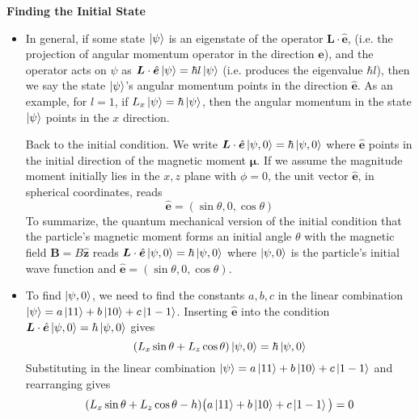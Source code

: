 \documentclass[11pt, a4paper]{article}
\renewcommand{\vec}[1]{\bm{#1}} %
\newcommand{\uvec}[1]{\hat{\vec{#1}}} %
\newcommand{\m}{\vec{\mu}}  %
\begin{document}
\textbf{Finding the Initial State}
\begin{itemize}	
	\item In general, if some state $ \ket{\psi} $ is an eigenstate of the operator $ \vec{L}\cdot \uvec{e} $, (i.e. the projection of angular momentum operator in the direction $ \uvec{e} $), and the operator acts on $ \psi $ as $  \vec{L}\cdot \uvec{e} \ket{\psi} = \hbar l \ket{\psi} $ (i.e. produces the eigenvalue $ \hbar l $), then we say the state $ \ket{\psi} $'s angular momentum points in the direction $ \uvec{e} $. As an example, for $ l = 1 $, if $ L_{x} \ket{\psi} = \hbar \ket{\psi} $, then the angular momentum in the state $ \ket{\psi} $ points in the $ x $ direction.
	
	Back to the initial condition. We write $ \vec{L}\cdot\uvec{e} \ket{\psi, 0} = \hbar \ket{\psi, 0} $ where $ \uvec{e} $ points in the initial direction of the magnetic moment $ \m $. If we assume the magnitude moment initially lies in the $ x, z $ plane with $ \phi = 0 $, the unit vector $ \uvec{e} $, in spherical coordinates, reads
	\begin{equation*}
		\uvec{e} = (\sin \theta, 0, \cos \theta)
	\end{equation*}
	To summarize, the quantum mechanical version of the initial condition that the particle's magnetic moment forms an initial angle $ \theta $ with the magnetic field $ \vec{B} = B \uvec{z} $ reads $ \vec{L}\cdot\uvec{e} \ket{\psi, 0} = \hbar \ket{\psi, 0} $ where $ \ket{\psi, 0} $ is the particle's initial wave function and $ \uvec{e} = (\sin \theta, 0, \cos \theta) $. 
	
	\item To find $ \ket{\psi, 0} $, we need to find the constants $ a, b, c $ in the linear combination $ \ket{\psi} = a \ket{11} + b \ket{10} + c \ket{1 -1} $. Inserting $ \uvec{e} $ into the condition $ \vec{L}\cdot\uvec{e} \ket{\psi, 0} = \hbar \ket{\psi, 0} $ gives
	\begin{equation*}
		(L_{x}\sin \theta + L_{z}\cos \theta)\ket{\psi, 0} = \hbar \ket{\psi, 0}
	\end{equation*}
	Substituting in the linear combination $ \ket{\psi} = a \ket{11} + b \ket{10} + c \ket{1 -1} $ and rearranging gives
	\begin{equation*}
		(L_{x}\sin \theta + L_{z}\cos \theta - h)\big(a \ket{11} + b\ket{10} + c\ket{1-1}\big) = 0
	\end{equation*}
	
\end{itemize}
\end{document}
